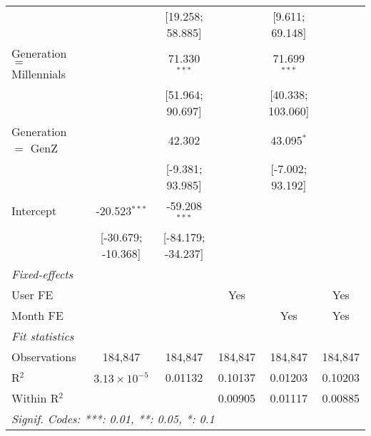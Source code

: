 \begin{table}[htbp]
\begin{threeparttable}[b]
\begin{tabular}{lccccc}
                                    &                       & [19.258; 58.885]   &                    & [9.611; 69.148]   &   \\   
         Generation $=$ Millennials &                       & 71.330$^{***}$     &                    & 71.699$^{***}$    &   \\   
                                    &                       & [51.964; 90.697]   &                    & [40.338; 103.060] &   \\   
         Generation $=$ GenZ        &                       & 42.302             &                    & 43.095$^{*}$      &   \\   
                                    &                       & [-9.381; 93.985]   &                    & [-7.002; 93.192]  &   \\   
         Intercept                  & -20.523$^{***}$       & -59.208$^{***}$    &                    &                   &   \\   
                                    & [-30.679; -10.368]    & [-84.179; -34.237] &                    &                   &   \\   
         \midrule
         \emph{Fixed-effects}\\
         User FE                    &                       &                    & Yes                &                   & Yes\\  
         Month FE                   &                       &                    &                    & Yes               & Yes\\  
         \midrule
         \emph{Fit statistics}\\
         Observations               & 184,847               & 184,847            & 184,847            & 184,847           & 184,847\\  
         R$^2$                      & $3.13\times 10^{-5}$  & 0.01132            & 0.10137            & 0.01203           & 0.10203\\  
         Within R$^2$               &                       &                    & 0.00905            & 0.01117           & 0.00885\\  
         \midrule \midrule
         \multicolumn{6}{l}{\emph{Signif. Codes: ***: 0.01, **: 0.05, *: 0.1}}\\
      \end{tabular}
   \end{threeparttable}
\end{table}


